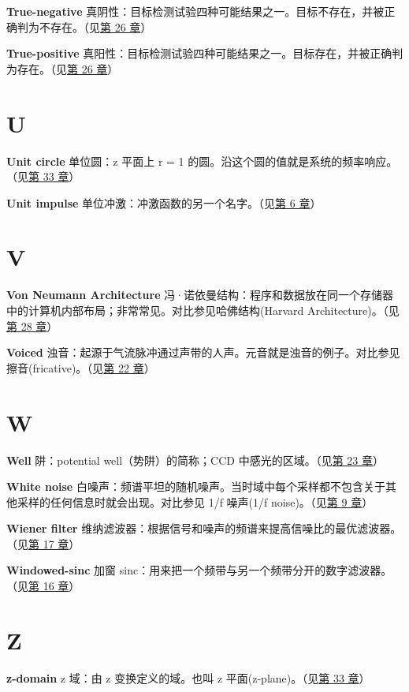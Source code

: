 \textbf{True-negative}
真阴性：目标检测试验四种可能结果之一。目标不存在，并被正确判为不存在。（见\hyperref[ch-26]{第
26 章}）

\textbf{True-positive}
真阳性：目标检测试验四种可能结果之一。目标存在，并被正确判为存在。（见\hyperref[ch-26]{第
26 章}）

\section{U}

\textbf{Unit circle} 单位圆：z 平面上 r = 1
的圆。沿这个圆的值就是系统的频率响应。（见\hyperref[ch-33]{第 33 章}）

\textbf{Unit impulse}
单位冲激：冲激函数的另一个名字。（见\hyperref[ch-06]{第 6 章}）

\section{V}

\textbf{Von Neumann Architecture}
冯·诺依曼结构：程序和数据放在同一个存储器中的计算机内部布局；非常常见。对比参见哈佛结构(Harvard
Architecture)。（见\hyperref[ch-28]{第 28 章}）

\textbf{Voiced}
浊音：起源于气流脉冲通过声带的人声。元音就是浊音的例子。对比参见擦音(fricative)。（见\hyperref[ch-22]{第
22 章}）

\section{W}

\textbf{Well} 阱：potential well（势阱）的简称；CCD
中感光的区域。（见\hyperref[ch-23]{第 23 章}）

\textbf{White noise}
白噪声：频谱平坦的随机噪声。当时域中每个采样都不包含关于其他采样的任何信息时就会出现。对比参见
1/f 噪声(1/f noise)。（见\hyperref[ch-09]{第 9 章}）

\textbf{Wiener filter}
维纳滤波器：根据信号和噪声的频谱来提高信噪比的最优滤波器。（见\hyperref[ch-17]{第
17 章}）

\textbf{Windowed-sinc} 加窗
sinc：用来把一个频带与另一个频带分开的数字滤波器。（见\hyperref[ch-16]{第
16 章}）

\section{Z}

\textbf{z-domain} z 域：由 z 变换定义的域。也叫 z
平面(z-plane)。（见\hyperref[ch-33]{第 33 章}）

